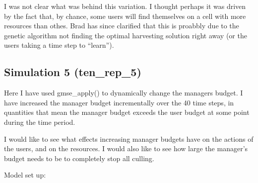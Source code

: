 \documentclass[
]{article}
\begin{document}
I was not clear what was behind this variation. I thought perhaps it was
driven by the fact that, by chance, some users will find themselves on a
cell with more resources than othes. Brad has since clarified that this
is proabbly due to the genetic algorithm not finding the optimal
harvesting solution right away (or the users taking a time step to
``learn'').

\hypertarget{simulation-5-ten_rep_5}{%
\subsection{Simulation 5 (ten\_rep\_5)}\label{simulation-5-ten_rep_5}}

Here I have used gmse\_apply() to dynamically change the managers
budget. I have increased the manager budget incrementally over the 40
time steps, in quantities that mean the manager budget exceeds the user
budget at some point during the time period.

I would like to see what effects increasing manager budgets have on the
actions of the users, and on the resources. I would also like to see how
large the manager's budget needs to be to completely stop all culling.

Model set up:
\end{document}
